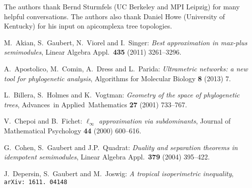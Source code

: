 \documentclass[12pt]{extarticle}
\numberwithin{theorem}{section}
\begin{document}
The authors thank Bernd Sturmfels (UC Berkeley and MPI Leipzig) for many helpful conversations. The authors also thank Daniel Howe (University of Kentucky) for his input on apicomplexa tree topologies.


\begin{thebibliography}{10}


M.~Akian, S.~Gaubert, N.~Viorel and I.~Singer:
{\em Best approximation in max-plus semimodules},
Linear Algebra Appl.~{\bf 435} (2011) 3261--3296. 

A.~Apostolico, M.~Comin, A.~Dress and L.~Parida:
{\em Ultrametric networks: a new tool for phylogenetic analysis},
Algorithms for Molecular Biology {\bf 8} (2013) 7.


 
 
 
 L.~Billera, S.~Holmes and K.~Vogtman:
{\em Geometry of the space of phylogenetic trees},
 Advances~in Applied~Mathematics {\bf 27} (2001) 733--767.


 V.~Chepoi and B.~Fichet:
{\em $\ell_\infty$ approximation via subdominants},
{Journal of Mathematical Psychology} {\bf 44} (2000) 600--616.
 
 G.~Cohen, S.~Gaubert and J.P.~Quadrat:
{\em Duality and separation theorems in idempotent semimodules},
Linear Algebra Appl.~{\bf 379} (2004) 395--422.

 J.~Depersin, S.~Gaubert and M.~Joswig:
{\em A tropical isoperimetric inequality},   {\tt arXiv: 1611. 04148}


\end{thebibliography}
\end{document}
